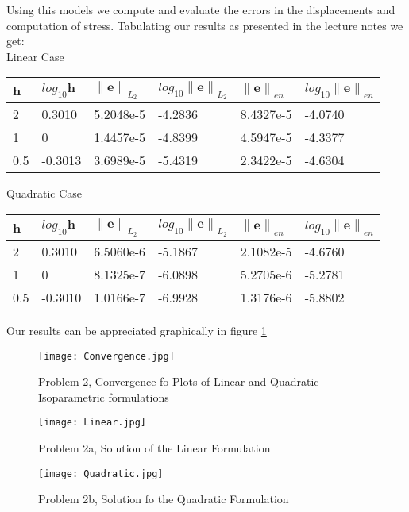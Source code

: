 \documentclass[a4paper]{memoir}
\begin{document}
Using this models we compute and evaluate the errors in the displacements and computation of stress. Tabulating our results as presented in the lecture notes we get: \\

Linear Case
\begin{center}
	\begin{tabular}{l|l||l|l||l|l}
		\hline
		\textbf{h} & $log_{10}\textbf{h}$ &	$\left\|\textbf{e} \right\|_{L_2}$ & $log_{10} \left\|\textbf{e} \right\|_{L_2}$ 
		& $\left\|\textbf{e} \right\|_{en}$ & $log_{10} \left\|\textbf{e} \right\|_{en}$  \\ 
		\hline \hline
		2   & 0.3010 	& 5.2048e-5 & -4.2836 & 8.4327e-5 & -4.0740 \\
		1   & 0 			& 1.4457e-5 & -4.8399 & 4.5947e-5 & -4.3377 \\
		0.5 & -0.3013 & 3.6989e-5 & -5.4319 & 2.3422e-5 & -4.6304 \\
		\hline
	\end{tabular}
\end{center}

Quadratic Case
\begin{center}
	\begin{tabular}{l|l||l|l||l|l}
		\hline
		\textbf{h} & $log_{10}\textbf{h}$ &	$\left\|\textbf{e} \right\|_{L_2}$ & $log_{10} \left\|\textbf{e} \right\|_{L_2}$ 
		& $\left\|\textbf{e} \right\|_{en}$ & $log_{10} \left\|\textbf{e} \right\|_{en}$  \\ 
		\hline \hline
		2		& 0.3010 	& 6.5060e-6 & -5.1867 & 2.1082e-5 & -4.6760 \\
		1		& 0 			& 8.1325e-7 & -6.0898 & 5.2705e-6 & -5.2781 \\
		0.5 & -0.3010 & 1.0166e-7 & -6.9928 & 1.3176e-6 & -5.8802	\\
		\hline
	\end{tabular}
\end{center}

Our results can be appreciated graphically in figure \ref{fig:convergence}
\begin{figure}
	\centering
		\texttt{[image: Convergence.jpg]}
	\caption{Problem 2, Convergence fo Plots of Linear and Quadratic Isoparametric formulations}
	\label{fig:convergence}
\end{figure}

\begin{figure}
	\centering
		\texttt{[image: Linear.jpg]}
	\caption{Problem 2a, Solution of the Linear Formulation}
	\label{fig:LineaIso}
\end{figure}

\begin{figure}
	\centering
		\texttt{[image: Quadratic.jpg]}
	\caption{Problem 2b, Solution fo the Quadratic Formulation}
	\label{fig:QuadIso}
\end{figure}
\end{document}

